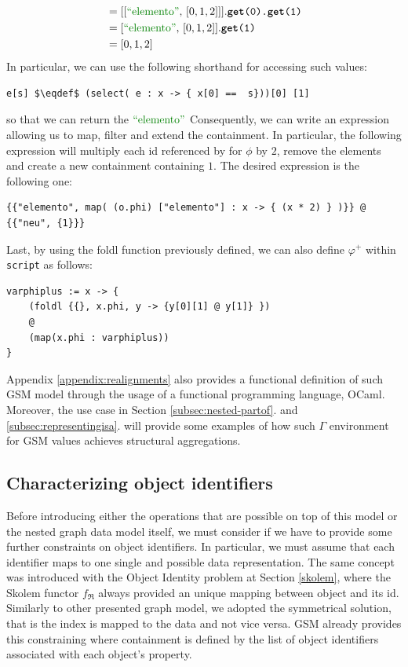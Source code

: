 \begin{example}
\begin{align*}
	&= [[\mstr{elemento},\, [0,1,2]]].\texttt{\textbf{get}(0).\textbf{get}(1)}\\
	&= [\mstr{elemento},\, [0,1,2]].\texttt{\textbf{get}(1)}\\
	&= [0,1,2]\\
	\end{align*}
	In particular, we can use the following shorthand for accessing such values:
\begin{lstlisting}[language=Script,mathescape=true]
e[s] $\eqdef$ (select( e : x -> { x[0] ==  s}))[0] [1]
\end{lstlisting}
	so that we can return the  $\mstr{elemento}$  Consequently, we can write an expression allowing us to map, filter and extend the containment. In particular, the following expression will multiply each id referenced by  for $\phi$ by $2$, remove the  elements and create a new containment  containing $1$. The desired expression is the following one:
\begin{lstlisting}[language=Script]
{{"elemento", map( (o.phi) ["elemento"] : x -> { (x * 2) } )}} @ {{"neu", {1}}}
\end{lstlisting}
\end{example}

Last, by using the foldl function previously defined, we can also define $\varphi^+$ within \texttt{script} as follows:
\begin{lstlisting}[language=Script]
varphiplus := x -> {
	(foldl {{}, x.phi, y -> {y[0][1] @ y[1]} })
	@
	(map(x.phi : varphiplus))
}
\end{lstlisting}

Appendix \vref{appendix:realignments} also provides a functional definition of such GSM model through the usage of a functional programming language, OCaml. Moreover, the use case in Section \vref{subsec:nested-partof}. and \vref{subsec:representingisa}. will provide some examples of how such $\Gamma$ environment for GSM values achieves structural aggregations.

\subsection{Characterizing object identifiers}
Before introducing either the operations that are possible on top of this model or the nested graph data model itself, we must consider if we have to provide some further constraints on  object identifiers. In particular, we must assume that each identifier maps to one single and possible data representation.  The same concept was introduced with the Object Identity problem at Section \vref{skolem}, where the Skolem functor $f_\Re$  always provided an unique mapping between object and its id. Similarly to other presented graph model, we adopted the symmetrical solution, that is the index is mapped to the data and not vice versa. GSM already provides this constraining where containment is defined by the list of object identifiers associated with each object's property.

